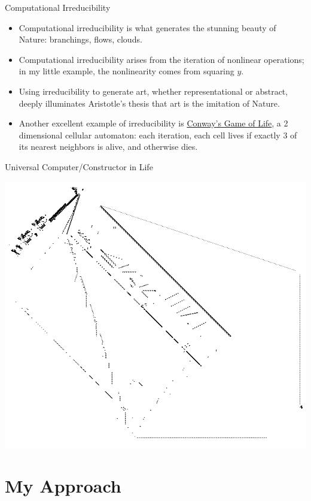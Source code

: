 \documentclass{beamer}
\begin{document}
\begin{frame}{Computational Irreducibility}
	\begin{itemize}
		\item
		    Computational irreducibility is what generates the stunning beauty of Nature: branchings, flows, clouds.
		  \item
			Computational irreducibility arises from the iteration of nonlinear operations; in my little example, the nonlinearity comes from squaring $y$.
		  \item
		    Using irreducibility to generate art, whether representational or abstract, deeply illuminates Aristotle's thesis that art is the imitation of Nature.
		 \item 
			Another excellent example of irreducibility is \href{https://www.shadertoy.com/view/MtyGWV}{Conway's Game of Life}, a 2 dimensional cellular automaton: each iteration, each cell lives if exactly 3 of its nearest neighbors is alive, and otherwise dies.
	\end{itemize}
\end{frame}

\begin{frame}{Universal Computer/Constructor in Life}
	\begin{center}
		\includegraphics[scale=.3334]{calcyman}
	\end{center}
\end{frame}

\section{My Approach}
\end{document}
